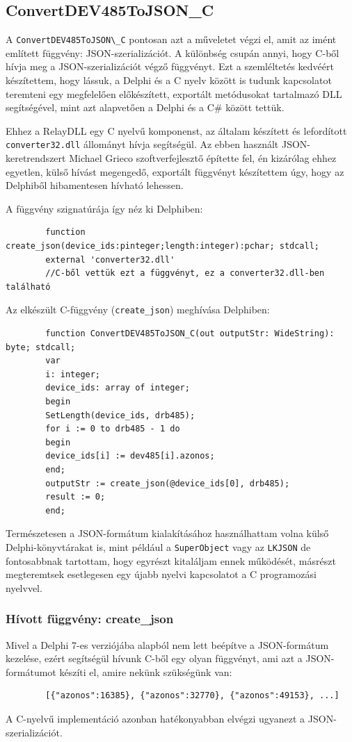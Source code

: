 \documentclass[tocnopagenum]{thesis-ekf}
\begin{document}
	\subsection{ConvertDEV485ToJSON\_C}
	A \verb*|ConvertDEV485ToJSON\_C| pontosan azt a műveletet végzi el, amit az imént említett függvény: JSON-szerializációt. A különbség csupán annyi, hogy C-ből hívja meg a JSON-szerializációt végző függvényt. Ezt a szemléltetés kedvéért készítettem, hogy lássuk, a Delphi és a C nyelv között is tudunk kapcsolatot teremteni egy megfelelően előkészített, exportált metódusokat tartalmazó DLL segítségével, mint azt alapvetően a Delphi és a C\# között tettük.
	
	Ehhez a RelayDLL egy C nyelvű komponenst, az általam készített és lefordított \verb*|converter32.dll| állományt hívja segítségül. Az ebben használt JSON-keretrendszert Michael Grieco szoftverfejlesztő építette fel, én kizárólag ehhez egyetlen, külső hívást megengedő, exportált függvényt készítettem úgy, hogy az Delphiből hibamentesen hívható lehessen.\cite{mgrieco}

	A függvény szignatúrája így néz ki Delphiben:
	\begin{verbatim}
		function create_json(device_ids:pinteger;length:integer):pchar; stdcall; 
		external 'converter32.dll' 
		//C-ből vettük ezt a függvényt, ez a converter32.dll-ben található
	\end{verbatim}

	Az elkészült C-függvény (\verb*|create_json|) meghívása Delphiben:
	\begin{verbatim}
		function ConvertDEV485ToJSON_C(out outputStr: WideString): byte; stdcall;
		var
		i: integer;
		device_ids: array of integer;
		begin
		SetLength(device_ids, drb485);
		for i := 0 to drb485 - 1 do
		begin
		device_ids[i] := dev485[i].azonos;
		end;
		outputStr := create_json(@device_ids[0], drb485);
		result := 0;
		end;
	\end{verbatim}
	
	Természetesen a JSON-formátum kialakításához használhattam volna külső Delphi-könyvtárakat is, mint például a \verb*|SuperObject| \cite{json_superobject}
	vagy az \verb*|LKJSON| \cite{json_lkjson} de fontosabbnak tartottam, hogy egyrészt kitaláljam ennek működését, másrészt megteremtsek esetlegesen egy újabb nyelvi kapcsolatot a C programozási nyelvvel.

	\subsubsection{Hívott függvény: create\_json}
	Mivel a Delphi 7-es verziójába alapból nem lett beépítve a JSON-formátum kezelése, ezért segítségül hívunk C-ből egy olyan függvényt, ami azt a JSON-formátumot készíti el, amire nekünk szükségünk van: 
	\begin{verbatim} 
		[{"azonos":16385}, {"azonos":32770}, {"azonos":49153}, ...]
	\end{verbatim}
	A C-nyelvű implementáció azonban hatékonyabban elvégzi ugyanezt a JSON-szerializációt.
\end{document}
